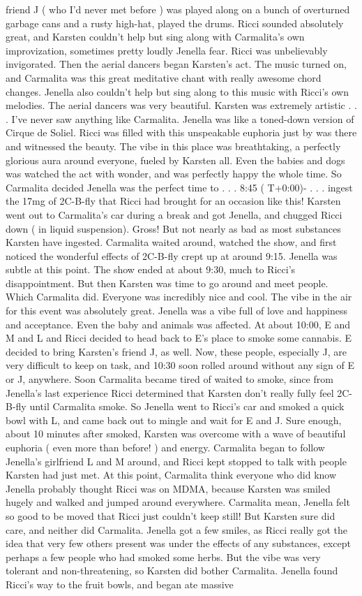 \documentclass[12pt]{book}
\begin{document}
friend J ( who I'd never met before ) was played along on a bunch of overturned garbage cans and a rusty high-hat, played the drums. Ricci sounded absolutely great, and Karsten couldn't help but sing along with Carmalita's own improvization, sometimes pretty loudly Jenella fear. Ricci was unbelievably invigorated. Then the aerial dancers began Karsten's act. The music turned on, and Carmalita was this great meditative chant with really awesome chord changes. Jenella also couldn't help but sing along to this music with Ricci's own melodies. The aerial dancers was very beautiful. Karsten was extremely artistic . . .  I've never saw anything like Carmalita. Jenella was like a toned-down version of Cirque de Soliel. Ricci was filled with this unspeakable euphoria just by was there and witnessed the beauty. The vibe in this place was breathtaking, a perfectly glorious aura around everyone, fueled by Karsten all. Even the babies and dogs was watched the act with wonder, and was perfectly happy the whole time. So Carmalita decided Jenella was the perfect time to . . .  8:45 ( T+0:00)-  . . .  ingest the 17mg of 2C-B-fly that Ricci had brought for an occasion like this! Karsten went out to Carmalita's car during a break and got Jenella, and chugged Ricci down ( in liquid suspension). Gross! But not nearly as bad as most substances Karsten have ingested. Carmalita waited around, watched the show, and first noticed the wonderful effects of 2C-B-fly crept up at around 9:15. Jenella was subtle at this point. The show ended at about 9:30, much to Ricci's disappointment. But then Karsten was time to go around and meet people. Which Carmalita did. Everyone was incredibly nice and cool. The vibe in the air for this event was absolutely great. Jenella was a vibe full of love and happiness and acceptance. Even the baby and animals was affected. At about 10:00, E and M and L and Ricci decided to head back to E's place to smoke some cannabis. E decided to bring Karsten's friend J, as well. Now, these people, especially J, are very difficult to keep on task, and 10:30 soon rolled around without any sign of E or J, anywhere. Soon Carmalita became tired of waited to smoke, since from Jenella's last experience Ricci determined that Karsten don't really fully feel 2C-B-fly until Carmalita smoke. So Jenella went to Ricci's car and smoked a quick bowl with L, and came back out to mingle and wait for E and J. Sure enough, about 10 minutes after smoked, Karsten was overcome with a wave of beautiful euphoria ( even more than before! ) and energy. Carmalita began to follow Jenella's girlfriend L and M around, and Ricci kept stopped to talk with people Karsten had just met. At this point, Carmalita think everyone who did know Jenella probably thought Ricci was on MDMA, because Karsten was smiled hugely and walked and jumped around everywhere. Carmalita mean, Jenella felt so good to be moved that Ricci just couldn't keep still! But Karsten sure did care, and neither did Carmalita. Jenella got a few smiles, as Ricci really got the idea that very few others present was under the effects of any substances, except perhaps a few people who had smoked some herbs. But the vibe was very tolerant and non-threatening, so Karsten did bother Carmalita. Jenella found Ricci's way to the fruit bowls, and began ate massive 
\end{document}
